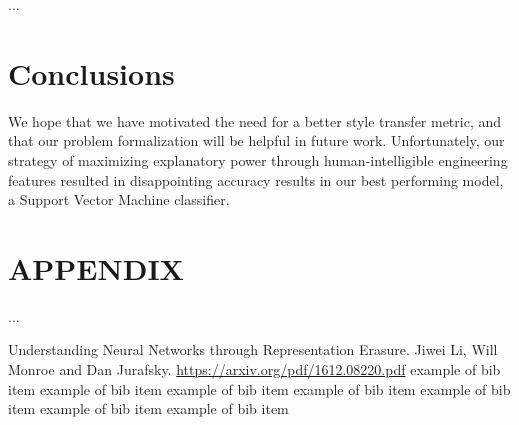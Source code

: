 \documentclass[letterpaper, 10 pt, conference]{ieeeconf}  %
\begin{document}
...
\section{Conclusions}
We hope that we have motivated the need for a better style transfer metric, and that our problem formalization will be helpful in future work. Unfortunately, our strategy of maximizing explanatory power through human-intelligible engineering features resulted in disappointing accuracy results in our best performing model, a Support Vector Machine classifier.



\addtolength{\textheight}{-12cm}   %







\section*{APPENDIX}

...


\begin{thebibliography}{99}

 Understanding Neural Networks through Representation Erasure. Jiwei Li, Will Monroe and Dan Jurafsky. \url{https://arxiv.org/pdf/1612.08220.pdf}
 example of bib item 
 example of bib item 
 example of bib item 
 example of bib item 
 example of bib item 
 example of bib item 
 example of bib item 

\end{thebibliography}
\end{document}
